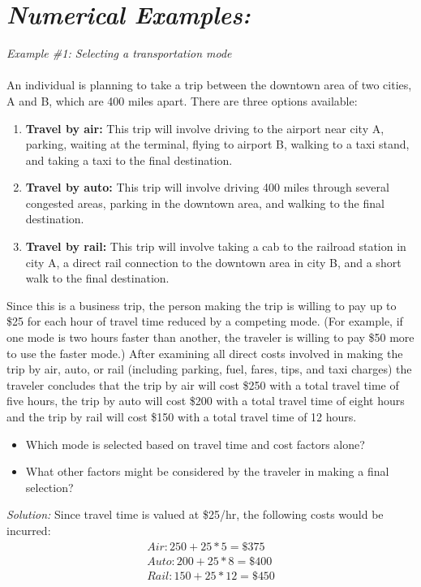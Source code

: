 \section{\emph{Numerical Examples:}}
\emph{Example \#1: Selecting a transportation mode}\\\\
An individual is planning to take a trip between the downtown area of two cities, A and B, which are 400 miles apart. There are three options available:
\begin{enumerate}
	\item \textbf{Travel by air:} This trip will involve driving to the airport near city A, parking, waiting at the terminal, flying to airport B, walking to a taxi stand, and taking a taxi to the final destination.
	\item \textbf{Travel by auto:} This trip will involve driving 400 miles through several congested areas, parking in the downtown area, and walking to the final destination.
	\item \textbf{Travel by rail:} This trip will involve taking a cab to the railroad station in city A, a direct rail connection to the downtown area in city B, and a short walk to the final destination.
\end{enumerate}
Since this is a business trip, the person making the trip is willing to pay up to \$25 for each hour of travel time reduced by a competing mode. (For example, if one mode is two hours faster than another, the traveler is willing to pay \$50 more to use the faster mode.) After examining all direct costs involved in making the trip by air, auto, or rail (including parking, fuel, fares, tips, and taxi charges) the traveler concludes that the trip by air will cost \$250 with a total travel time of five hours, the trip by auto will cost \$200 with a total travel time of eight hours and the trip by rail will cost \$150 with a total travel time of 12 hours.
\begin{itemize}
	\item Which mode is selected based on travel time and cost factors alone?
	\item What other factors might be considered by the traveler in making a final selection?
\end{itemize}
\emph{Solution:} Since travel time is valued at \$25/hr, the following costs would be incurred:\\
\begin{gather*}
	Air: 250 + 25 * 5 = \$375\\
	Auto: 200 + 25 * 8 = \$400\\
	Rail: 150 + 25 * 12 = \$450
\end{gather*}
